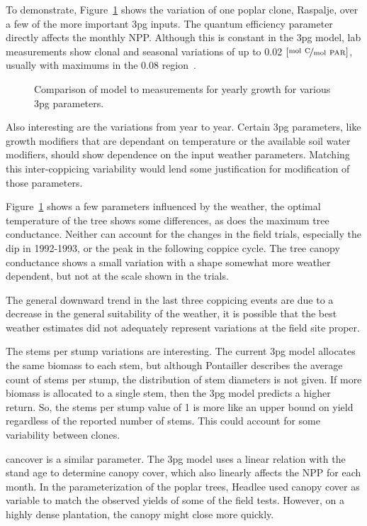 \documentclass[10pt]{article}
\begin{document}
To demonstrate, Figure~\ref{fig:pont-variation} shows the variation of one
poplar clone, Raspalje, over a few of the more important \ac{3pg} inputs.  The
quantum efficiency parameter directly affects the monthly \ac{NPP}.  Although
this is constant in the \ac{3pg} model, lab measurements show clonal and
seasonal variations of up to 0.02 $[\unitfrac{mol~C}{mol~PAR}]$, usually with
maximums in the 0.08 region~\cite{Bernacchi2003}.


\begin{figure}[!ht]
  \centering
  
  \caption{Comparison of model to measurements for yearly growth for various \ac{3pg} parameters.  }
\label{fig:pont-variation}
\end{figure}

Also interesting are the variations from year to year.  Certain \ac{3pg}
parameters, like growth modifiers that are dependant on temperature or the
available soil water modifiers, should show dependence on the input weather
parameters.  Matching this inter-coppicing variability would lend some
justification for modification of those parameters.

Figure~\ref{fig:pont-variation} shows a few parameters influenced by the
weather, the optimal temperature of the tree shows some differences, as does the
maximum tree conductance.  Neither can account for the changes in the field
trials, especially the dip in 1992-1993, or the peak in the following coppice
cycle.  The tree canopy conductance shows a small variation with a shape
somewhat more weather dependent, but not at the scale shown in the trials.

The general downward trend in the last three coppicing events are due to a
decrease in the general suitability of the weather, it is possible that the
best weather estimates did not adequately represent variations at the field site
proper.

The stems per stump variations are interesting. The current \ac{3pg} model
allocates the same biomass to each stem, but although Pontailler describes the
average count of stems per stump, the distribution of stem diameters is not
given.  If more biomass is allocated to a single stem, then the \ac{3pg} model
predicts a higher return.  So, the stems per stump value of 1 is more like an
upper bound on yield regardless of the reported number of stems.  This could
account for some variability between clones.

\acf{cancover} is a similar parameter.  The \ac{3pg} model uses a linear
relation with the stand age to determine canopy cover, which also linearly
affects the \ac{NPP} for each month.  In the parameterization of the poplar
trees, Headlee used canopy cover as variable to match the observed yields of some
of the field tests.  However, on a highly dense plantation, the canopy might
close more quickly.  
\end{document}
